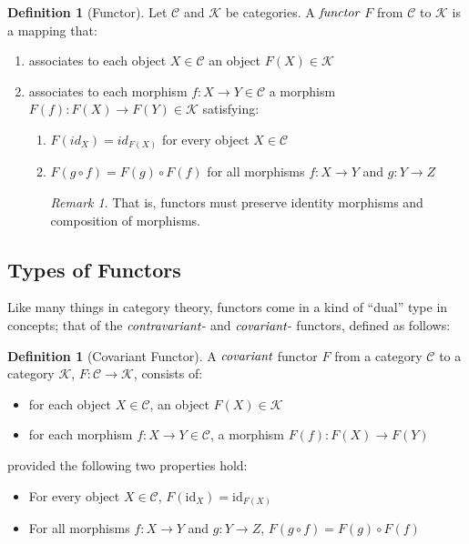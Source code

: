 \documentclass[10pt, oneside, reqno]{amsart}
\theoremstyle{plain}%
\theoremstyle{definition}
\newtheorem{defn}[thm]{Definition}
\theoremstyle{remark}
\newtheorem*{rem}{Remark}
\newcommand{\id}{\mbox{id}_}
\begin{document}
\begin{defn}[Functor]
	Let $\mathcal{C}$ and $\mathcal{K}$ be categories. A $\emph{functor}$ $F$ from $\mathcal{C}$ to $\mathcal{K}$ is a mapping that:
	\begin{enumerate}
		\item associates to each object $X \in \mathcal{C}$ an object $F(X) \in  \mathcal{K}$
		
		\item associates to each morphism $f : X \to Y \in \mathcal{C}$ a morphism $F(f) : F(X) \to F(Y) \in \mathcal{K}$
		satisfying:
		\begin{enumerate}
			\item $F(id_{X}) = id_{F(X)}$ for every object $X \in \mathcal{C}$
			
			\item $F(g \circ f) = F(g) \circ F(f)$ for all morphisms $f : X \to Y$ and $g : Y \to Z$
			\begin{rem}
				That is, functors must preserve identity morphisms and composition of morphisms.
			\end{rem}
		\end{enumerate}
	\end{enumerate}
\end{defn}

\subsection{Types of Functors} %
\label{subsec:functorstypes}
Like many things in category theory, functors come in a kind of ``dual'' type in concepts;
that of the $\emph{contravariant}$- and $\emph{covariant}$- functors, defined as follows:

\begin{defn}[Covariant Functor]
 A $\emph{covariant}$ functor $F$ from a category $\mathcal{C}$ to a category $\mathcal{K}$, $F: \mathcal{C} \to \mathcal{K}$, consists of:
 \begin{itemize}
  \item for each object $X \in \mathcal{C}$, an object $F(X) \in \mathcal{K}$
  \item for each morphism $f: X \to Y \in \mathcal{C}$, a morphism $F(f): F(X) \to F(Y)$
 \end{itemize}
 provided the following two properties hold:
 \begin{itemize}
  \item For every object $X \in \mathcal{C}$, $F(\id{X}) = \id{F(X)}$
  \item For all morphisms $f: X \to Y$ and $g: Y \to Z$, $F(g \circ f) = F(g) \circ F(f)$
 \end{itemize}
\end{defn}
\end{document}
